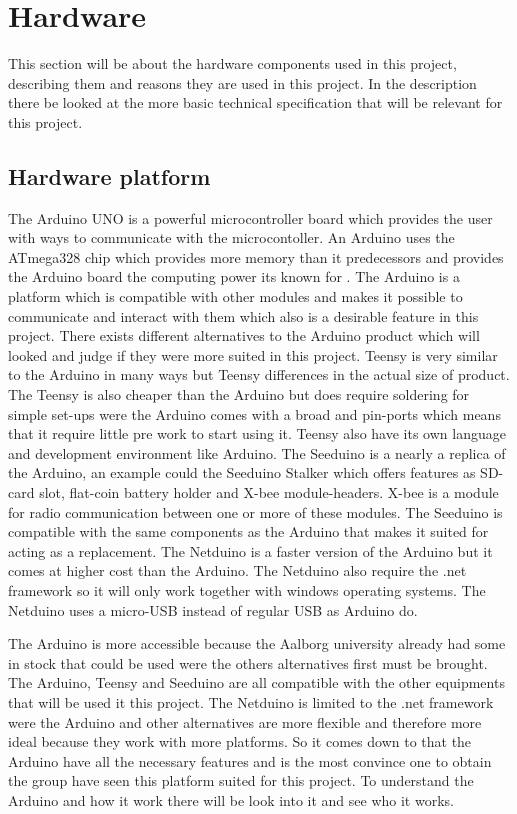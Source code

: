 \section{Hardware}
This section will be about the hardware components used in this project, describing them and reasons they are used in this project. In the description there be looked at the more basic technical specification that will be relevant for this project.
\subsection{Hardware platform}
The Arduino UNO is a powerful microcontroller board which provides the user with ways to communicate with the microcontoller. An Arduino uses the ATmega328 chip which provides more memory than it predecessors and provides the Arduino board the computing power its known for \citep{ArduinoUno}. The Arduino is a platform which is compatible with other modules and makes it possible to communicate and interact with them which also is a desirable feature in this project.
There exists different alternatives to the Arduino product which will looked and judge if they were more suited in this project. Teensy is very similar to the Arduino in many ways but Teensy differences in the actual size of product. The Teensy is also cheaper than the Arduino but does require soldering for simple set-ups were the Arduino comes with a broad and pin-ports which means that it require little pre work to start using it. Teensy also have its own language and development environment like Arduino.
The Seeduino is a nearly a replica of the Arduino, an example could the Seeduino Stalker which offers features as SD-card slot, flat-coin battery holder and X-bee module-headers. X-bee is a module for radio communication between one or more of these modules. The Seeduino is compatible with the same components as the Arduino that makes it suited for acting as a replacement. 
The Netduino is a faster version of the Arduino but it comes at higher cost than the Arduino. The Netduino also require the .net framework so it will only work together with windows operating systems. The Netduino uses a micro-USB instead of regular USB as Arduino do.

The Arduino is more accessible because the Aalborg university already had some in stock that could be used were the others alternatives first must be brought. The Arduino, Teensy and Seeduino are all compatible with the other equipments that will be used it this project. The Netduino is limited to the .net framework were the Arduino and other alternatives are more flexible and therefore more ideal because they work with more platforms.
So it comes down to that the Arduino have all the necessary features and is the most convince one to obtain the group have seen this platform suited for this project. To understand the Arduino and how it work there will be look into it and see who it works.

